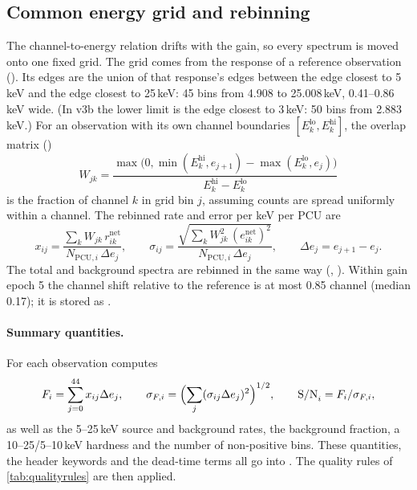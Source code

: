 \subsection{Common energy grid and rebinning}\label{sec:grid}
The channel-to-energy relation drifts with the gain, so every spectrum is moved onto one fixed grid. The grid comes from the
response of a reference observation (). Its edges are the union of that response's
 edges between the edge closest to 5\,keV and the edge closest to 25\,keV: 45 bins from 4.908 to 25.008\,keV,
0.41--0.86\,keV wide. (In v3b the lower limit is the edge closest to 3\,keV: 50 bins from 2.883\,keV.) For an observation
with its own channel boundaries $[E^\mathrm{lo}_k,E^\mathrm{hi}_k]$, the overlap matrix ()
\[
W_{jk}=\frac{\max\bigl(0,\min(E^\mathrm{hi}_k,e_{j+1})-\max(E^\mathrm{lo}_k,e_j)\bigr)}{E^\mathrm{hi}_k-E^\mathrm{lo}_k}
\]
is the fraction of channel $k$ in grid bin $j$, assuming counts are spread uniformly within a channel. The rebinned
rate and error per keV per PCU are
\begin{equation}
x_{ij}=\frac{\sum_kW_{jk}\,r^\mathrm{net}_{ik}}{N_{\mathrm{PCU},i}\,\Delta e_j},\qquad
\sigma_{ij}=\frac{\sqrt{\sum_kW_{jk}^2\,(e^\mathrm{net}_{ik})^2}}{N_{\mathrm{PCU},i}\,\Delta e_j},\qquad\Delta e_j=e_{j+1}-e_j.\label{eq:rebin}
\end{equation}
The total and background spectra are rebinned in the same way (, ). Within gain epoch 5 the
channel shift relative to the reference is at most 0.85 channel (median 0.17); it is stored as
.

\paragraph{Summary quantities.} For each observation  computes
\begin{equation}
F_i=\sum_{j=0}^{44}x_{ij}\Delta e_j,\qquad \sigma_{F,i}=\Bigl(\sum_j(\sigma_{ij}\Delta e_j)^2\Bigr)^{1/2},\qquad
\mathrm{S/N}_i=F_i/\sigma_{F,i},\label{eq:F}
\end{equation}
as well as the 5--25\,keV source and background rates, the background fraction, a 10--25/5--10\,keV hardness and the
number of non-positive bins. These quantities, the header keywords and the dead-time terms all go into
. The quality rules of \cref{tab:qualityrules} are then applied.

